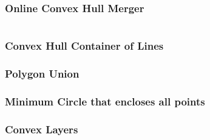 \noindent \hrulefill \vspace{-\baselineskip}
\begin{multicols}{2}
\inputminted[autogobble,fontsize=\tiny]{C++}{Geometry/graham_scan.cpp}
\end{multicols}
\vspace{-\baselineskip}
\noindent \hrulefill

\noindent \hrulefill \vspace{-\baselineskip}
\begin{multicols}{2}
\inputminted[autogobble,fontsize=\tiny]{python3}{Geometry/graham_scan.py}
\end{multicols}
\vspace{-\baselineskip}
\noindent \hrulefill

\subsubsection{Online Convex Hull Merger}

\hrulefill \vspace{-\baselineskip}
\begin{multicols}{2}
\inputminted[autogobble,fontsize=\tiny]{C++}{Geometry/dynamic_convex.cpp}
\end{multicols}
\vspace{-\baselineskip}
\noindent \hrulefill

\subsubsection{Convex Hull Container of Lines}
\subsubsection{Polygon Union}
\subsubsection{Minimum Circle that encloses all points}
\subsubsection{Convex Layers}

\noindent \hrulefill \vspace{-\baselineskip}
\begin{multicols}{2}
\inputminted[autogobble,fontsize=\tiny]{C++}{Geometry/convex_layers.cpp}
\end{multicols}
\vspace{-\baselineskip}
\noindent \hrulefill

